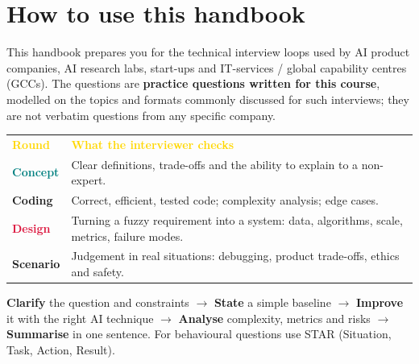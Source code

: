 \documentclass[11pt]{article}
\begin{document}
\section*{How to use this handbook}
This handbook prepares you for the technical interview loops used by AI product companies, AI research labs, start-ups and IT-services / global capability centres (GCCs). The questions are \textbf{practice questions written for this course}, modelled on the topics and formats commonly discussed for such interviews; they are not verbatim questions from any specific company.
\begin{center}\begin{tabular}{>{\bfseries}l p{11cm}}
\rowcolor{navy}\textcolor{gold}{Round}&\textcolor{gold}{\textbf{What the interviewer checks}}\\
\textcolor{teal}{Concept}&Clear definitions, trade-offs and the ability to explain to a non-expert.\\
\rowcolor{ivory}\textcolor{navyL}{Coding}&Correct, efficient, tested code; complexity analysis; edge cases.\\
\textcolor{crimson}{Design}&Turning a fuzzy requirement into a system: data, algorithms, scale, metrics, failure modes.\\
\rowcolor{ivory}\textcolor{leaf}{Scenario}&Judgement in real situations: debugging, product trade-offs, ethics and safety.\\
\end{tabular}\end{center}
\begin{keypoint}
\textbf{Clarify} the question and constraints $\rightarrow$ \textbf{State} a simple baseline $\rightarrow$ \textbf{Improve} it with the right AI technique $\rightarrow$ \textbf{Analyse} complexity, metrics and risks $\rightarrow$ \textbf{Summarise} in one sentence. For behavioural questions use STAR (Situation, Task, Action, Result).
\end{keypoint}
\end{document}
